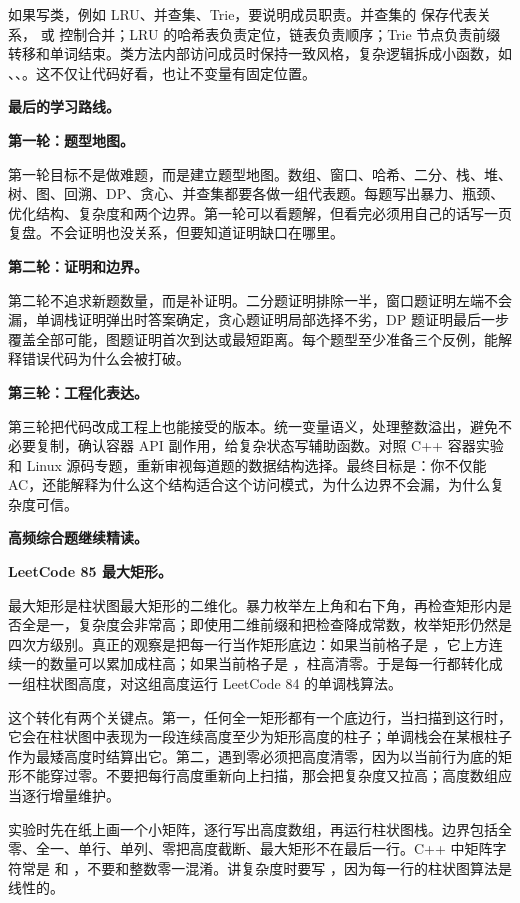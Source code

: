 如果写类，例如 LRU、并查集、Trie，要说明成员职责。并查集的  保存代表关系， 或  控制合并；LRU 的哈希表负责定位，链表负责顺序；Trie 节点负责前缀转移和单词结束。类方法内部访问成员时保持一致风格，复杂逻辑拆成小函数，如 、、。这不仅让代码好看，也让不变量有固定位置。

\noindent\textbf{最后的学习路线。}

\noindent\textbf{第一轮：题型地图。}

第一轮目标不是做难题，而是建立题型地图。数组、窗口、哈希、二分、栈、堆、树、图、回溯、DP、贪心、并查集都要各做一组代表题。每题写出暴力、瓶颈、优化结构、复杂度和两个边界。第一轮可以看题解，但看完必须用自己的话写一页复盘。不会证明也没关系，但要知道证明缺口在哪里。

\noindent\textbf{第二轮：证明和边界。}

第二轮不追求新题数量，而是补证明。二分题证明排除一半，窗口题证明左端不会漏，单调栈证明弹出时答案确定，贪心题证明局部选择不劣，DP 题证明最后一步覆盖全部可能，图题证明首次到达或最短距离。每个题型至少准备三个反例，能解释错误代码为什么会被打破。

\noindent\textbf{第三轮：工程化表达。}

第三轮把代码改成工程上也能接受的版本。统一变量语义，处理整数溢出，避免不必要复制，确认容器 API 副作用，给复杂状态写辅助函数。对照 C++ 容器实验和 Linux 源码专题，重新审视每道题的数据结构选择。最终目标是：你不仅能 AC，还能解释为什么这个结构适合这个访问模式，为什么边界不会漏，为什么复杂度可信。

\noindent\textbf{高频综合题继续精读。}

\noindent\textbf{LeetCode 85 最大矩形。}

最大矩形是柱状图最大矩形的二维化。暴力枚举左上角和右下角，再检查矩形内是否全是一，复杂度会非常高；即使用二维前缀和把检查降成常数，枚举矩形仍然是四次方级别。真正的观察是把每一行当作矩形底边：如果当前格子是 ，它上方连续一的数量可以累加成柱高；如果当前格子是 ，柱高清零。于是每一行都转化成一组柱状图高度，对这组高度运行 LeetCode 84 的单调栈算法。

这个转化有两个关键点。第一，任何全一矩形都有一个底边行，当扫描到这行时，它会在柱状图中表现为一段连续高度至少为矩形高度的柱子；单调栈会在某根柱子作为最矮高度时结算出它。第二，遇到零必须把高度清零，因为以当前行为底的矩形不能穿过零。不要把每行高度重新向上扫描，那会把复杂度又拉高；高度数组应当逐行增量维护。

实验时先在纸上画一个小矩阵，逐行写出高度数组，再运行柱状图栈。边界包括全零、全一、单行、单列、零把高度截断、最大矩形不在最后一行。C++ 中矩阵字符常是  和 ，不要和整数零一混淆。讲复杂度时要写 ，因为每一行的柱状图算法是线性的。

